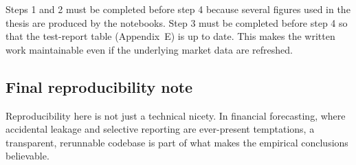 Steps 1 and 2 must be completed before step 4 because several figures used in the thesis are produced by the notebooks.
Step 3 must be completed before step 4 so that the test-report table (Appendix~E) is up to date.
This makes the written work maintainable even if the underlying market data are refreshed.

\subsection{Final reproducibility note}

Reproducibility here is not just a technical nicety. In financial forecasting, where accidental leakage and selective reporting are ever-present temptations, a transparent, rerunnable codebase is part of what makes the empirical conclusions believable.
